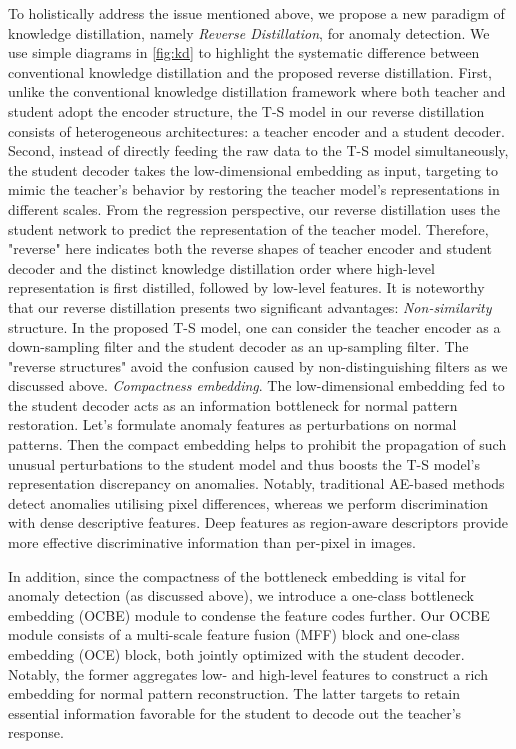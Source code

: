 \documentclass[10pt,twocolumn,letterpaper]{article}
\begin{document}
To holistically address the issue mentioned above, we propose a new paradigm of knowledge distillation, namely \emph{Reverse Distillation}, for anomaly detection. We use simple diagrams in \cref{fig:kd} to highlight the systematic difference between conventional knowledge distillation and the proposed reverse distillation. First, unlike the conventional knowledge distillation framework where both teacher and student adopt the encoder structure, the T-S model in our reverse distillation consists of heterogeneous architectures: a teacher encoder and a student decoder. Second, instead of directly feeding the raw data to the T-S model simultaneously, the student decoder takes the low-dimensional embedding as input, targeting to mimic the teacher's behavior by restoring the teacher model's representations in different scales. From the regression perspective, our reverse distillation uses the student network to predict the representation of the teacher model. Therefore, "reverse" here indicates both the reverse shapes of teacher encoder and student decoder and the distinct knowledge distillation order where high-level representation is first distilled, followed by low-level features. It is noteworthy that our reverse distillation presents two significant advantages:  \emph{Non-similarity} structure. In the proposed T-S model, one can consider the teacher encoder as a down-sampling filter and the student decoder as an up-sampling filter. The "reverse structures" avoid the confusion caused by non-distinguishing filters \cite{mkd} as we discussed above.  \emph{Compactness embedding}. The low-dimensional embedding fed to the student decoder acts as an information bottleneck for normal pattern restoration. Let's formulate anomaly features as perturbations on normal patterns. Then the compact embedding helps to prohibit the propagation of such unusual perturbations to the student model and thus boosts the T-S model's representation discrepancy on anomalies.   Notably, traditional AE-based methods \cite{ssimae,memae,mnad,daad} detect anomalies utilising pixel differences, whereas we perform discrimination with dense descriptive features. Deep features as region-aware descriptors provide more effective discriminative information than per-pixel in images.

In addition, since the compactness of the bottleneck embedding is vital for anomaly detection (as discussed above), we introduce a one-class bottleneck embedding (OCBE) module to condense the feature codes further. Our OCBE module consists of a multi-scale feature fusion (MFF) block and one-class embedding (OCE) block, both jointly optimized with the student decoder. Notably, the former aggregates low- and high-level features to construct a rich embedding for normal pattern reconstruction. The latter targets to retain essential information favorable for the student to decode out the teacher's response.
\end{document}
